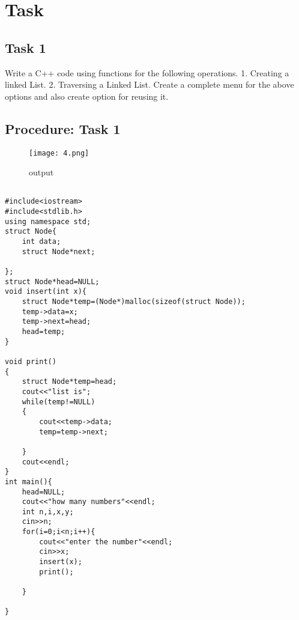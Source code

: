 \documentclass[11pt]{article}            %
\begin{document}
\section{Task}  
\subsection{ Task 1 }     


Write a C++ code using functions for the following operations. 
 1. 
Creating a linked List. 
2. 
Traversing a Linked List. 
 Create a complete menu for the above options and also create option for reusing 
it. 
 

\subsection{Procedure: Task 1 }    
\begin{figure*}
\centering
  \texttt{[image: 4.png]}
\caption{output}
\label{Figure:3}    
\end{figure*} 

\begin{lstlisting}

#include<iostream>
#include<stdlib.h>
using namespace std;
struct Node{
	int data;
	struct Node*next;
	
};
struct Node*head=NULL;
void insert(int x){
	struct Node*temp=(Node*)malloc(sizeof(struct Node));
	temp->data=x;
	temp->next=head;
	head=temp;
}

void print()
{
	struct Node*temp=head;
	cout<<"list is";
	while(temp!=NULL)
	{
		cout<<temp->data;
		temp=temp->next;
		
	}
	cout<<endl;
}
int main(){
	head=NULL;
	cout<<"how many numbers"<<endl;
	int n,i,x,y;
	cin>>n;
	for(i=0;i<n;i++){
		cout<<"enter the number"<<endl;
		cin>>x;
		insert(x);
		print();
	
	}
	
}

\end{lstlisting}

 
\end{document}
